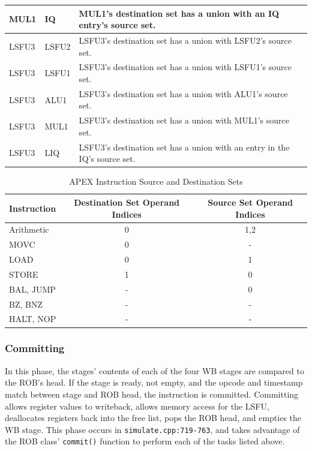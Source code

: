 \documentclass[12pt]{article}
\begin{document}
\begin{table}
\begin{tabular}{l|l|p{5.0in}}
    MUL1 & IQ & MUL1's destination set has a union with an IQ entry's source set. \\
    \hline
    LSFU3 & LSFU2 & LSFU3's destination set has a union with LSFU2's source set. \\
    LSFU3 & LSFU1 & LSFU3's destination set has a union with LSFU1's source set. \\
    LSFU3 & ALU1 & LSFU3's destination set has a union with ALU1's source set. \\
    LSFU3 & MUL1 & LSFU3's destination set has a union with MUL1's source set. \\
    LSFU3 & LIQ & LSFU3's destination set has a union with an entry in the IQ's source set. \\
  \end{tabular}
\end{table}

\begin{table}
  \centering
  \caption{APEX Instruction Source and Destination Sets}
  \label{tab:instsets}
  \begin{tabular}{l|c|c}
    Instruction & Destination Set Operand Indices & Source Set Operand Indices\\
    \hline
    Arithmetic					 	& 0 & 1,2\\
    MOVC 							& 0 & - \\
    LOAD							& 0 & 1 \\
    STORE							& 1 & 0 \\
    BAL, JUMP						& - & 0 \\
    BZ, BNZ 						& - & - \\
    HALT, NOP						& - & - \\
  \end{tabular}
\end{table}

\subsubsection{Committing}
In this phase, the stages' contents of each of the four WB stages are compared to the ROB's head. If the stage is ready, not empty, and the opcode and timestamp match between stage and ROB head, the instruction is committed.
Committing allows register values to writeback, allows memory access for the LSFU, deallocates registers back into the free list, pops the ROB head, and empties the WB stage.
This phase occurs in \texttt{simulate.cpp:719-763}, and takes advantage of the ROB class' \texttt{commit()} function to perform each of the tasks listed above.
\end{document}
